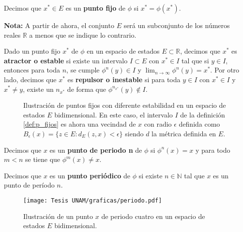 \documentclass[../Main.tex]{subfiles}
\begin{document}
\begin{definition}
\label{}
    Decimos que $x^*\in E$ es un \textbf{punto fijo} de $\phi$ si $x^*=\phi(x^*)$.
\end{definition}
\textbf{Nota:} A partir de ahora, el conjunto $E$ será un subconjunto de los números reales $\mathbb{R}$ a menos que se indique lo contrario.
\begin{definition}
\label{def:p_fijos}
    Dado un punto fijo $x^*$ de $\phi$ en un espacio de estados $E\subset\mathbb{R}$, decimos que $x^*$ es \textbf{atractor o estable} si existe un intervalo $I\subset E$ con $x^*\in I$ tal que si $y\in I$, entonces para toda $n$, se cumple $\phi^n(y)\in I$ y $\lim_{n\rightarrow\infty}\phi^n(y)=x^*$. Por otro lado, decimos que $x^*$ es \textbf{repulsor o inestable} si para toda $y\in I$ con $x^*\in I$ y $x^*\neq y$, existe un $n_{x^*}$ de forma que $\phi^{n_{x^*}}(y)\notin I$.
\end{definition}

\begin{figure}[h!]
\hfill
{}
\hfill
{}
\hfill
\caption{Ilustración de puntos fijos con diferente estabilidad en un espacio de estados $E$ bidimensional. En este caso, el intervalo $I$ de la definición \ref{def:p_fijos} es ahora una vecindad de $x$ con radio $\epsilon$ definida como $B_{\epsilon}(x)=\{z\in E: d_E(z,x)<\epsilon\}$ siendo $d$ la métrica definida en $E$.}
\label{fig:p_fijos}
\end{figure}
\begin{definition}
\label{}
    Decimos que $x$ es un \textbf{punto de periodo n} de $\phi$ si $\phi^n(x)=x$ y para todo $m<n$ se tiene que $\phi^m(x)\neq x$.
\end{definition}
\begin{definition}
\label{}
    Decimos que $x$ es un \textbf{punto periódico} de $\phi$ si existe $n \in \mathbb{N}$ tal que $x$ es un punto de período $n$.
\end{definition}

\begin{figure}[h!]
    \centering
    \texttt{[image: Tesis UNAM/graficas/periodo.pdf]}
    \caption{Ilustración de un punto $x$ de periodo cuatro en un espacio de estados $E$ bidimensional.}
    \label{fig:periodo}
\end{figure} 
\end{document}
